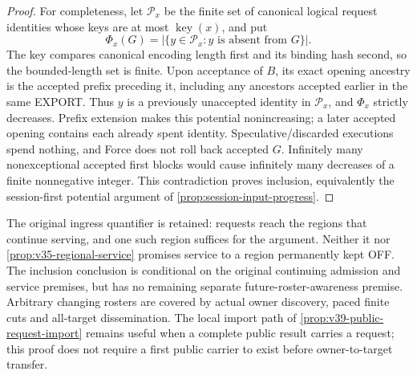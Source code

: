\begin{proof}
For completeness, let $\mathcal P_x$ be the finite set of canonical
logical request identities whose keys are at most
$\operatorname{key}(x)$, and put
\[
 \Phi_x(G)=|\{y\in\mathcal P_x:y\text{ is absent from }G\}|.
\]
The key compares canonical encoding length first and its binding hash
second, so the bounded-length set is finite. Upon acceptance of $B$,
its exact opening ancestry is the accepted prefix preceding it,
including any ancestors accepted earlier in the same EXPORT. Thus $y$
is a previously unaccepted identity in $\mathcal P_x$, and $\Phi_x$
strictly decreases. Prefix extension makes this potential nonincreasing;
a later accepted opening contains each already spent identity.
Speculative/discarded executions spend nothing, and Force does not roll
back accepted $G$. Infinitely many nonexceptional accepted first blocks
would cause infinitely many decreases of a finite nonnegative integer.
This contradiction proves inclusion, equivalently the session-first
potential argument of \cref{prop:session-input-progress}.
\end{proof}

The original ingress quantifier is retained: requests reach the regions
that continue serving, and one such region suffices for the argument.
Neither it nor \cref{prop:v35-regional-service} promises service to a
region permanently kept OFF. The inclusion conclusion is conditional
on the original continuing admission and service premises, but has no
remaining separate future-roster-awareness premise. Arbitrary changing
rosters are covered by actual owner discovery, paced finite cuts and
all-target dissemination. The local import path of
\cref{prop:v39-public-request-import} remains useful when a complete
public result carries a request; this proof does not require a first
public carrier to exist before owner-to-target transfer.

